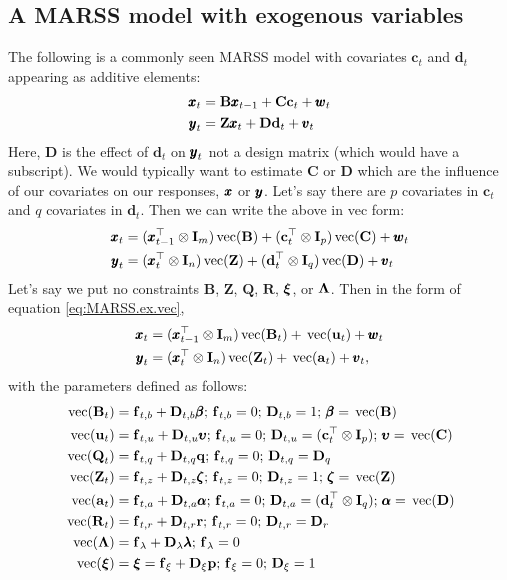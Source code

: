 \documentclass[]{article}
\def\uupsilon{\pmb{\upsilon}}
\def\llambda{\pmb{\lambda}}
\def\bbeta{\pmb{\beta}}
\def\aalpha{\pmb{\alpha}}
\def\zzeta{\pmb{\zeta}}
\def\xixi{\mbox{\boldmath $\xi$}}
\def\LAM{\mbox{\boldmath $\Lambda$}}
\def\ZZ{\mbox{$\mathbf Z$}}	\def\zz{\mbox{$\mathbf z$}}
\def\BB{\mbox{$\mathbf B$}}	\def\bb{\mbox{$\mathbf b$}}
\def\CC{\mbox{$\mathbf C$}}	\def\cc{\mbox{$\mathbf c$}}
\def\DD{\mbox{$\mathbf D$}}	\def\dd{\mbox{$\mathbf d$}}
\def\II{\mbox{$\mathbf I$}} \def\ii{\mbox{$\mathbf i$}}
\def\QQ{\mbox{$\mathbf Q$}}	 \def\qq{\mbox{$\mathbf q$}}
\def\RR{\mbox{$\mathbf R$}}	 \def\rr{\mbox{$\mathbf r$}}
\def\vec{\,\textup{\textrm{vec}}}
\begin{document}
\subsection{A MARSS model with exogenous variables}
The following is a commonly seen MARSS model with covariates $\cc_t$ and $\dd_t$ appearing as additive elements:
\begin{equation*}
\begin{split}
\xx_t &= \BB\xx_{t-1} + \CC\cc_t + \ww_t\\
\yy_t &= \ZZ\xx_t + \DD\dd_t + \vv_t 
\end{split}
\end{equation*}
Here, $\DD$ is the effect of $\dd_t$ on $\mbox{$\pmb{y}$}_t$ not a design matrix (which would have a subscript).  We would typically want to estimate $\CC$ or $\DD$ which are the influence of our covariates on our responses, $\mbox{$\pmb{x}$}$ or $\mbox{$\pmb{y}$}$.  Let's say there are $p$ covariates in $\cc_t$ and $q$ covariates in $\dd_t$.  Then we can write the above in vec form:
\begin{equation}\label{eq:MARSS.simple.ex}
\begin{split}
\xx_t &= (\xx_{t-1}^\top \otimes \II_m)\vec(\BB) + (\cc_t^\top \otimes \II_p)\vec(\CC) + \ww_t\\
\yy_t &= (\xx_t^\top \otimes \II_n)\vec(\ZZ) + (\dd_t^\top \otimes \II_q)\vec(\DD) + \vv_t 
\end{split}
\end{equation}
Let's say we put no constraints $\BB$, $\ZZ$, $\QQ$, $\RR$, $\xixi$, or $\LAM$.  Then in the form of equation \ref{eq:MARSS.ex.vec},
\begin{equation*}
\begin{split}
\xx_t &= (\xx_{t-1}^\top \otimes \II_m)\vec(\BB_t) + \vec(\uu_t) + \ww_t\\
\yy_t &= (\xx_t^\top \otimes \II_n)\vec(\ZZ_t) + \vec(\aa_t) + \vv_t,
\end{split}
\end{equation*}
with the parameters defined as follows:
\begin{equation*}
\begin{split}
\vec(\BB_t) &= \ff_{t,b} + \DD_{t,b}\bbeta;
\, \ff_{t,b} = 0;\, \DD_{t,b}=1;\, \bbeta=\vec(\BB)\\
\vec(\uu_t) &= \ff_{t,u} + \DD_{t,u}\uupsilon;
\, \ff_{t,u} = 0;\, \DD_{t,u}=(\cc_t^\top \otimes \II_p);\, \uupsilon=\vec(\CC)\\
\vec(\QQ_t) &= \ff_{t,q} + \DD_{t,q}\qq;
\, \ff_{t,q}= 0;\,  \DD_{t,q}= \DD_q \\
\vec(\ZZ_t) &= \ff_{t,z} + \DD_{t,z}\zzeta;
\, \ff_{t,z} = 0;\, \DD_{t,z}=1;\, \zzeta=\vec(\ZZ)\\
\vec(\aa_t) &= \ff_{t,a} + \DD_{t,a}\aalpha;
\, \ff_{t,a} = 0;\, \DD_{t,a}=(\dd_t^\top \otimes \II_q);\, \aalpha=\vec(\DD)\\
\vec(\RR_t) &= \ff_{t,r} + \DD_{t,r}\rr;
\, \ff_{t,r}= 0;\,  \DD_{t,r}= \DD_r \\
\vec(\LAM)&= \ff_\lambda+\DD_\lambda\llambda;
\, \ff_\lambda= 0 \\
\vec(\xixi)&= \xixi=\ff_\xi+\DD_\xi\pp;
\, \ff_\xi = 0; \, \DD_\xi = 1
\end{split}
\end{equation*}
\end{document}
